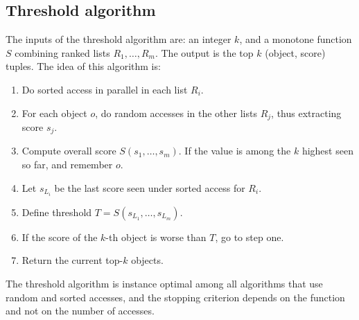 \subsection*{Threshold algorithm}
The inputs of the threshold algorithm are: an integer $k$, and a monotone function $S$ combining ranked lists $R_1,\dots,R_m$. 
The output is the top $k$ (object, score) tuples. The idea of this algorithm is: 
\begin{enumerate}
    \item Do sorted access in parallel in each list $R_i$. 
    \item For each object $o$, do random accesses in the other lists $R_j$, thus extracting score $s_j$. 
    \item Compute overall score $S(s_1, \dots, s_m)$. If the value is among the $k$ highest seen so far, and remember $o$. 
    \item Let $s_{L_i}$ be the last score seen under sorted access for $R_i$. 
    \item Define threshold $T=S(s_{L_1}, \dots, s_{L_m})$. 
    \item If the score of the $k$-th object is worse than $T$, go to step one. 
    \item Return the current top-$k$ objects. 
\end{enumerate}
The threshold algorithm is instance optimal among all algorithms that use random and sorted accesses, and the stopping criterion depends 
on the function and not on the number of accesses. 
